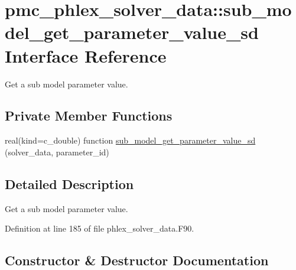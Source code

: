 \hypertarget{interfacepmc__phlex__solver__data_1_1sub__model__get__parameter__value__sd}{}\section{pmc\+\_\+phlex\+\_\+solver\+\_\+data\+:\+:sub\+\_\+model\+\_\+get\+\_\+parameter\+\_\+value\+\_\+sd Interface Reference}
\label{interfacepmc__phlex__solver__data_1_1sub__model__get__parameter__value__sd}


Get a sub model parameter value.  


\subsection*{Private Member Functions}
\begin{DoxyCompactItemize}
\item 
real(kind=c\+\_\+double) function \mbox{\hyperlink{interfacepmc__phlex__solver__data_1_1sub__model__get__parameter__value__sd_a6eee391808cd8ac61e7d422c11775183}{sub\+\_\+model\+\_\+get\+\_\+parameter\+\_\+value\+\_\+sd}} (solver\+\_\+data, parameter\+\_\+id)
\end{DoxyCompactItemize}


\subsection{Detailed Description}
Get a sub model parameter value. 

Definition at line 185 of file phlex\+\_\+solver\+\_\+data.\+F90.



\subsection{Constructor \& Destructor Documentation}
\mbox{\label{interfacepmc__phlex__solver__data_1_1sub__model__get__parameter__value__sd_a6eee391808cd8ac61e7d422c11775183}} 
